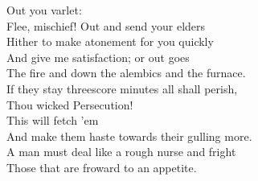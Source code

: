 \documentclass[a4paper,oneside,12pt]{memoir}
\begin{document}
\begin{drama*}
\subtlespeaks {} Out you varlet:\\
Flee, mischief! Out and send your elders\\
Hither to make atonement for you quickly\\
And give me satisfaction; or out goes\\
The fire and down the alembics and the furnace.\\
If they stay threescore minutes all shall perish,\\
Thou wicked Persecution!\\
 This will fetch 'em\\
And make them haste towards their gulling more.\\
A man must deal like a rough nurse and fright\\
Those that are froward to an appetite.\\

\scene


\end{drama*}
\end{document}
